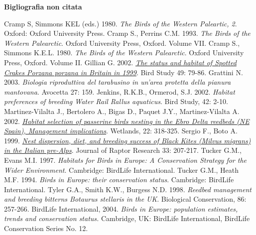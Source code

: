 \documentclass[10pt,twoside,openany,x11names,svgnames,italian,a5paper,dvipsnames,table]{memoir}
\newcommand{\backgroundrectanglecolor}{F8!80!white}      %
\begin{document}
\makeatletter
\renewcommand\@biblabel[1]{\textcolor{\backgroundrectanglecolor}{$\bullet$}}
\makeatother

\renewcommand*{\bibname}{Bibliografia non citata}
\textbf{\large Bigliografia non citata} 
\begin{thebibliography}{9}
\footnotesize
{} Cramp S, Simmons KEL (eds.) 1980. \emph{The Birds of the Western Paleartic, 2}. Oxford: Oxford University Press.
 Cramp S., Perrins C.M. 1993. \emph{The Birds of the Western Palearctic}. Oxford University Press, Oxford. Volume VII.
 Cramp S., Simmons K.E.L. 1980. \emph{The Birds of the Western Palearctic}. Oxford University Press, Oxford. Volume II.
 Gillian G. 2002. \href{http://www.tandfonline.com/doi/pdf/10.1080/00063650209461247}{\emph{The status and habitat of Spotted Crakes Porzana porzana in Britain in 1999}}. Bird Study 49: 79-86.
 Grattini N. 2003. \emph{Biologia riproduttiva del tarabusino in un'area protetta della pianura mantovana}. Avocetta 27: 159.
 Jenkins, R.K.B., Ormerod, S.J. 2002. \emph{Habitat preferences of breeding Water Rail Rallus aquaticus}. Bird Study, 42: 2-10.
 Martinez-Vilalta J., Bertolero A., Bigas D., Paquet J.Y., Martinez-Vilalta A. 2002. \href{http://www.researchgate.net/publication/225556327_Habitat_selection_of_passerine_birds_nesting_in_the_Ebro_Delta_reedbeds_(NE_Spain)_Management_implications/file/79e4150f71df9ec967.pdf}{\emph{Habitat selection of passerine birds nesting in the Ebro Delta reedbeds (NE Spain), Management implications}}. Wetlands, 22: 318-325. 
 Sergio F., Boto A. 1999. \href{https://sora.unm.edu/sites/default/files/journals/jrr/v033n03/p00207-p00217.pdf}{\emph{Nest dispersion, diet, and breeding success of Black Kites (\emph{Milvus migrans}) in the Italian pre-Alps}}. Journal of Raptor Research 33: 207-217.
 Tucker G.M., Evans M.I. 1997. \emph{Habitats for Birds in Europe: A Conservation Strategy for the Wider Environment}. Cambridge: BirdLife International.
 Tucker G.M., Heath M.F. 1994. \emph{Birds in Europe: their conservation status}. Cambridge: BirdLife International.
 Tyler G.A., Smith K.W., Burgess N.D. 1998. \emph{Reedbed management and breeding bitterns Botaurus stellaris in the UK}. Biological Conservation, 86: 257-266.
 BirdLife International, 2004. \emph{Birds in Europe: population estimates, trends and conservation status.} Cambridge, UK: BirdLife International, BirdLife Conservation Series No. 12.
\end{thebibliography}
\endgroup
\cleartoverso
\end{document}
